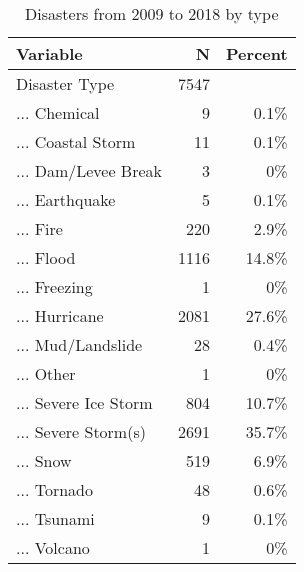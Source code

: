 \begin{table}[!htbp] \centering \renewcommand*{\arraystretch}{1.1}\caption{Disasters from 2009 to 2018 by type}\label{DisasterTypes}
\begin{tabular}{lrr}
\hline
\hline
Variable & N & Percent \\ 
\hline
Disaster Type & 7547 &  \\ 
... Chemical & 9 & 0.1\% \\ 
... Coastal Storm & 11 & 0.1\% \\ 
... Dam/Levee Break & 3 & 0\% \\ 
... Earthquake & 5 & 0.1\% \\ 
... Fire & 220 & 2.9\% \\ 
... Flood & 1116 & 14.8\% \\ 
... Freezing & 1 & 0\% \\ 
... Hurricane & 2081 & 27.6\% \\ 
... Mud/Landslide & 28 & 0.4\% \\ 
... Other & 1 & 0\% \\ 
... Severe Ice Storm & 804 & 10.7\% \\ 
... Severe Storm(s) & 2691 & 35.7\% \\ 
... Snow & 519 & 6.9\% \\ 
... Tornado & 48 & 0.6\% \\ 
... Tsunami & 9 & 0.1\% \\ 
... Volcano & 1 & 0\%\\ 
\hline
\hline
\end{tabular}
\end{table}

